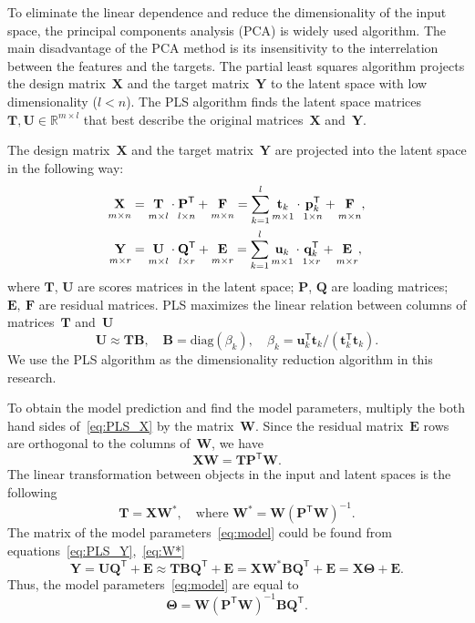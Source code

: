 \documentclass[12pt,twoside]{article}
\theoremstyle{definition}
\newcommand{\bY}{\mathbf{Y}}
\newcommand{\bX}{\mathbf{X}}
\newcommand{\bu}{\mathbf{u}}
\newcommand{\bt}{\mathbf{t}}
\newcommand{\bp}{\mathbf{p}}
\newcommand{\bq}{\mathbf{q}}
\newcommand{\bP}{\mathbf{P}}
\newcommand{\bT}{\mathbf{T}}
\newcommand{\bB}{\mathbf{B}}
\newcommand{\bQ}{\mathbf{Q}}
\newcommand{\bE}{\mathbf{E}}
\newcommand{\bF}{\mathbf{F}}
\newcommand{\bU}{\mathbf{U}}
\newcommand{\bW}{\mathbf{W}}
\newcommand{\T}{\mathsf{T}}
\newcommand{\bTheta}{\boldsymbol{\Theta}}
\begin{document}
To eliminate the linear dependence and reduce the dimensionality of the input space, the principal components analysis (PCA) is widely used algorithm. 
The main disadvantage of the PCA method is its insensitivity to the interrelation between the features and the targets.
The partial least squares algorithm projects the design matrix~$\bX$ and the target matrix~$\bY$ to the latent space with low dimensionality ($l < n$).
The PLS algorithm finds the latent space matrices $\bT, \bU \in \mathbb{R}^{m \times l}$ that best describe the original matrices~$\bX$ and~$\bY$.

The design matrix~$\bX$ and the target matrix~$\bY$ are projected into the latent space in the following way:
\begin{align}
\label{eq:PLS_X}
\underset{m \times n}{\vphantom{\bQ}\bX} 
&= \underset{m \times l}{\vphantom{\bQ}\bT} \cdot \underset{l \times n}{\vphantom{\bQ}\bP^{\T}} + \underset{m \times n}{\vphantom{\bQ}\bF} 
= \sum_{k=1}^l \underset{m \times 1}{\vphantom{\bp_k^{\T}}\bt_k} \cdot \underset{1 \times n}{\bp_k^{\T}} + \underset{m \times n}{\vphantom{\bp_k^{\T}}\bF},\\
\label{eq:PLS_Y}
\underset{m \times r}{\vphantom{\bQ}\bY} 
&= \underset{m \times l}{\vphantom{\bQ}\bU} \cdot \underset{l \times r}{\bQ^{\T}} + \underset{m \times r}{\vphantom{\bQ}\bE}
=  \sum_{k=1}^l  \underset{m \times 1}{\vphantom{\bq_k^{\T}}\bu_k} \cdot \underset{1 \times r}{\bq_k^{\T}} +  \underset{m \times r}{\vphantom{\bq_k^{\T}}\bE},
\end{align}
where $\bT$, $\bU$ are scores matrices in the latent space; $\bP$, $\bQ$ are loading matrices; $\bE,\ \bF$ are residual matrices. PLS maximizes the linear relation between columns of matrices~$\bT$ and~$\bU$
\begin{equation*}
\bU \approx \bT \bB, \quad \bB = \text{diag}(\beta_k), \quad \beta_k = \bu_k^{\T}\bt_k / (\bt_k^{\T}\bt_k).
\end{equation*}
We use the PLS algorithm as the dimensionality reduction algorithm in this research.

To obtain the model prediction and find the model parameters, multiply the both hand sides of~\eqref{eq:PLS_X} by the matrix~$\bW$. 
Since the residual matrix~$\bE$ rows are orthogonal to the columns of~$\bW$, we have
\begin{equation*}
\bX \bW = \bT \bP^{\T} \bW.
\end{equation*}
The linear transformation between objects in the input and latent spaces is the following
\begin{equation}
\bT = \bX \bW^*, \quad \text{where } \bW^* = \bW (\bP^{\T} \bW)^{-1}.
\label{eq:W*}
\end{equation}
The matrix of the model parameters~\eqref{eq:model} could be found from equations~\eqref{eq:PLS_Y},~\eqref{eq:W*}
\begin{equation}
\bY = \bU \bQ^{\T} + \bE \approx \bT \bB \bQ^{\T}+ \bE = \bX \bW^* \bB \bQ^{\T} + \bE = \bX \bTheta + \bE.
\label{eq:pls_model}
\end{equation}
Thus, the model parameters~\eqref{eq:model} are equal to
\begin{equation*}
\bTheta = \bW (\bP^{\T} \bW)^{-1} \bB \bQ^{\T}.
\end{equation*}
\end{document}

